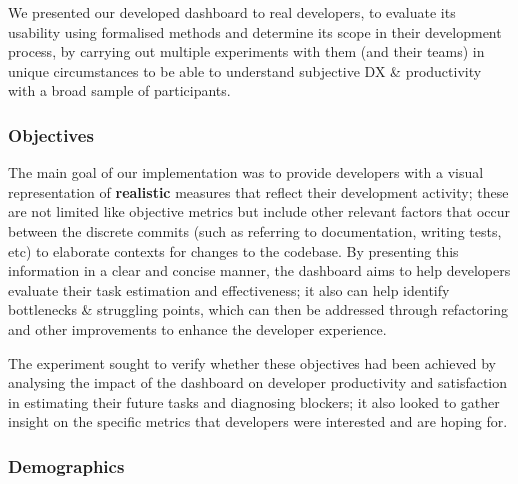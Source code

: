 \documentclass[../mpaper.tex]{subfiles}
\begin{document}
We presented our developed dashboard to real developers, to evaluate its usability using formalised methods and determine its scope in their development process, by carrying out multiple experiments with them (and their teams) in unique circumstances to be able to understand subjective DX \& productivity with a broad sample of participants.

\subsubsection*{Objectives}

The main goal of our implementation was to provide developers with a visual representation of \textbf{realistic} measures that reflect their development activity; these are not limited like objective metrics but include other relevant factors that occur between the discrete commits (such as referring to documentation, writing tests, etc) to elaborate contexts for changes to the codebase. By presenting this information in a clear and concise manner, the dashboard aims to help developers evaluate their task estimation and effectiveness; it also can help identify bottlenecks \& struggling points, which can then be addressed through refactoring and other improvements to enhance the developer experience.

The experiment sought to verify whether these objectives had been achieved by analysing the impact of the dashboard on developer productivity and satisfaction in estimating their future tasks and diagnosing blockers; it also looked to gather insight on the specific metrics that developers were interested and are hoping for.

\subsubsection*{Demographics}
\end{document}
